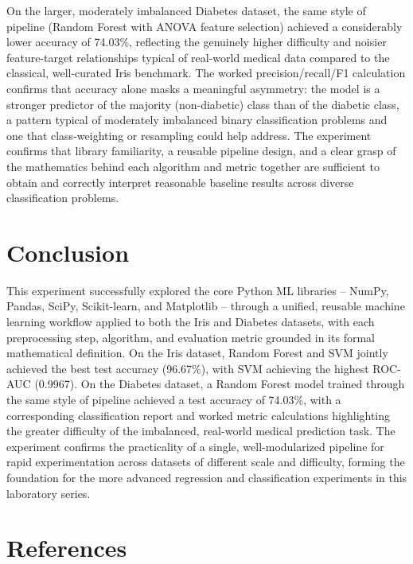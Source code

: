 \documentclass[12pt,a4paper]{article}
\begin{document}
On the larger, moderately imbalanced Diabetes dataset, the same style of pipeline (Random Forest with ANOVA feature selection) achieved a considerably lower accuracy of 74.03\%, reflecting the genuinely higher difficulty and noisier feature-target relationships typical of real-world medical data compared to the classical, well-curated Iris benchmark. The worked precision/recall/F1 calculation confirms that accuracy alone masks a meaningful asymmetry: the model is a stronger predictor of the majority (non-diabetic) class than of the diabetic class, a pattern typical of moderately imbalanced binary classification problems and one that class-weighting or resampling could help address. The experiment confirms that library familiarity, a reusable pipeline design, and a clear grasp of the mathematics behind each algorithm and metric together are sufficient to obtain and correctly interpret reasonable baseline results across diverse classification problems.

\section{Conclusion}

This experiment successfully explored the core Python ML libraries -- NumPy, Pandas, SciPy, Scikit-learn, and Matplotlib -- through a unified, reusable machine learning workflow applied to both the Iris and Diabetes datasets, with each preprocessing step, algorithm, and evaluation metric grounded in its formal mathematical definition. On the Iris dataset, Random Forest and SVM jointly achieved the best test accuracy (96.67\%), with SVM achieving the highest ROC-AUC (0.9967). On the Diabetes dataset, a Random Forest model trained through the same style of pipeline achieved a test accuracy of 74.03\%, with a corresponding classification report and worked metric calculations highlighting the greater difficulty of the imbalanced, real-world medical prediction task. The experiment confirms the practicality of a single, well-modularized pipeline for rapid experimentation across datasets of different scale and difficulty, forming the foundation for the more advanced regression and classification experiments in this laboratory series.

\section{References}
\end{document}
